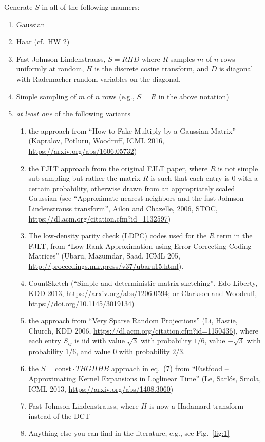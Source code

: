 \documentclass[10pt, letterpaper]{scrartcl}
\begin{document}
\begin{enumerate}[align=left, leftmargin=*, label=\sffamily\bfseries Problem \arabic*:]
    Generate $S$ in all of the following manners:
    \begin{enumerate}
        \item Gaussian
        \item Haar (cf.\ HW 2)
        \item Fast Johnson-Lindenstrauss, $S=RHD$ where $R$ samples $m$ of $n$ rows uniformly at random, $H$ is the discrete cosine transform, and $D$ is diagonal with Rademacher random variables on the diagonal.
        \item Simple sampling of $m$ of $n$ rows (e.g., $S=R$ in the above notation)
        \item \emph{at least one} of the following variants
            \begin{enumerate}
                \item the approach from ``How to Fake Multiply by a Gaussian Matrix'' (Kapralov, Potluru, Woodruff, ICML 2016, \url{https://arxiv.org/abs/1606.05732})
                \item the FJLT approach from the original FJLT paper, where $R$ is not simple sub-sampling but rather the matrix $R$ is such that each entry is $0$ with a certain probability, otherwise drawn from an appropriately scaled Gaussian (see ``Approximate nearest neighbors and the fast Johnson-Lindenstrauss transform'', Ailon and Chazelle, 2006, STOC, \url{https://dl.acm.org/citation.cfm?id=1132597})
                \item The low-density parity check (LDPC) codes used for the $R$ term in the FJLT, from ``Low Rank Approximation using Error Correcting Coding Matrices'' (Ubaru, Mazumdar, Saad, ICML 205, 
\url{http://proceedings.mlr.press/v37/ubaru15.html}).
                \item CountSketch (``Simple and deterministic matrix sketching'', Edo Liberty, KDD 2013, \url{https://arxiv.org/abs/1206.0594}; or Clarkson and Woodruff, \url{https://doi.org/10.1145/3019134})
                \item the approach from ``Very Sparse Random Projections'' (Li, Hastie, Church, KDD 2006, \url{https://dl.acm.org/citation.cfm?id=1150436}),
                where each entry $S_{ij}$ is iid with value $\sqrt{3}$ with probability $1/6$, value $-\sqrt{3}$ with probability $1/6$, and value $0$ with probability $2/3$.
                \item the $S=\text{const}\cdot  THG\Pi H B$ approach in eq.\ (7) from
                ``Fastfood -- Approximating Kernel Expansions in Loglinear Time'' (Le, Sarl\'os, Smola, ICML 2013, \url{https://arxiv.org/abs/1408.3060})
                \item Fast Johnson-Lindenstrauss, where $H$ is now a Hadamard transform instead of the DCT
                \item Anything else you can find in the literature, e.g., see Fig.~\ref{fig:1}
            \end{enumerate}
        \end{enumerate}
    

\end{enumerate}
\end{document}
